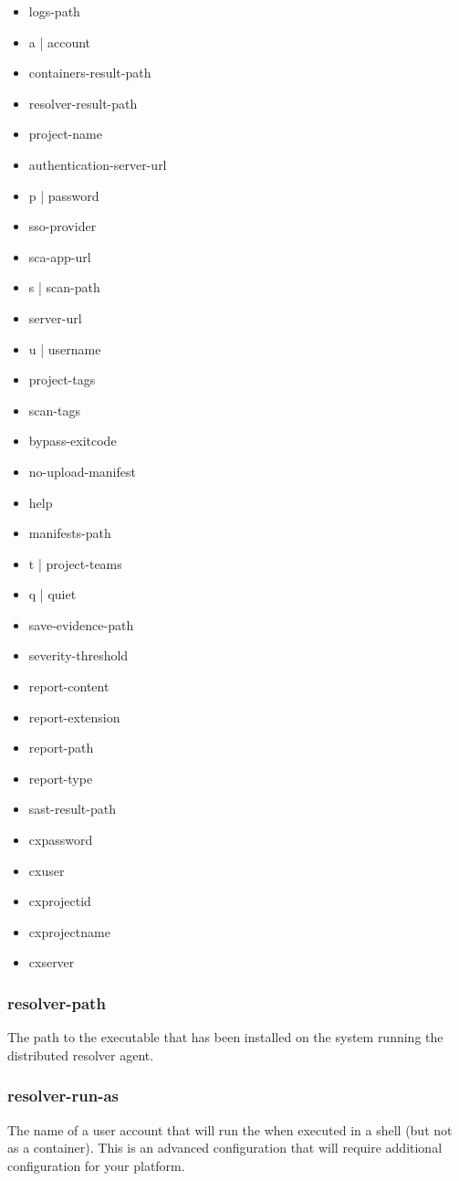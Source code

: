 \begin{itemize}
  \item logs-path
  \item a | account
  \item containers-result-path
  \item resolver-result-path
  \item project-name
  \item authentication-server-url
  \item p | password
  \item sso-provider
  \item sca-app-url
  \item s | scan-path
  \item server-url
  \item u | username
  \item project-tags
  \item scan-tags
  \item bypass-exitcode
  \item no-upload-manifest
  \item help
  \item manifests-path
  \item t | project-teams
  \item q | quiet
  \item save-evidence-path
  \item severity-threshold
  \item report-content
  \item report-extension
  \item report-path
  \item report-type
  \item sast-result-path
  \item cxpassword
  \item cxuser
  \item cxprojectid
  \item cxprojectname
  \item cxserver
\end{itemize}

\subsubsection{resolver-path}\label{sec:agent-resolver-path}
The path to the \scaresolver executable that has been installed on the system running the distributed resolver agent.


\subsubsection{resolver-run-as}\label{sec:agent-resolver-run-as}
The name of a user account that will run the \scaresolver when executed in a shell (but not as a container).  This
is an advanced configuration that will require additional configuration for your platform.  

